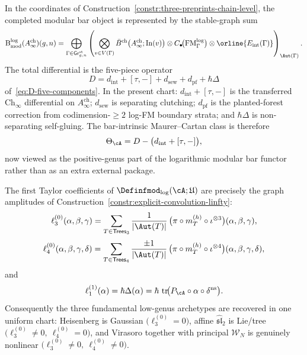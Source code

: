 \begin{construction}
\label{constr:log-modular-bar-functor}
In the coordinates of Construction~\ref{constr:three-preprints-chain-level},
the completed modular bar object is represented by the stable-graph sum
\begin{equation}
\label{eq:log-modular-bar-functor}
\mathrm{B}^{\log}_{\mathrm{mod}}(A^{\mathrm{ch}}_\infty)(g,n)
=
\bigoplus_{\Gamma\in \mathsf{Gr}^{\mathrm{st}}_{g,n}}
\left(
\bigotimes_{v\in V(\Gamma)}
\bar B^{\mathrm{ch}}\bigl(A^{\mathrm{ch}}_\infty;\mathrm{In}(v)\bigr)
\otimes
C_\bullet\!\bigl(\operatorname{FM}^{\log}_{\Gamma}\bigr)
\otimes
\orline{E_{\mathrm{int}}(\Gamma)}
\right)_{\Aut(\Gamma)}.
\end{equation}
The total differential is the five-piece operator
\[
D
=
d_{\mathrm{int}}+[\tau,-]+d_{\mathrm{sew}}+d_{\mathrm{pf}}+\hbar\Delta
\]
of~\eqref{eq:D-five-components}.  In the present chart:
$d_{\mathrm{int}}+[\tau,-]$ is the transferred
$\mathrm{Ch}_\infty$ differential on $A^{\mathrm{ch}}_\infty$;
$d_{\mathrm{sew}}$ is separating clutching;
$d_{\mathrm{pf}}$ is the planted-forest correction from codimension-$\geq2$
log-FM boundary strata; and $\hbar\Delta$ is non-separating self-gluing.
The bar-intrinsic Maurer--Cartan class is therefore
\[
\Theta_\cA
=
D-\bigl(d_{\mathrm{int}}+[\tau,-]\bigr),
\]
now viewed as the positive-genus part of the logarithmic modular bar
functor rather than as an extra external package.
\end{construction}

\begin{computation}
\label{comp:low-genus-log-fm-chart}
The first Taylor coefficients of
$\Definfmod_{\log}(\cA;\mathfrak U)$ are precisely the graph amplitudes of
Construction~\ref{constr:explicit-convolution-linfty}:
\[
\ell_3^{(0)}(\alpha,\beta,\gamma)
=
\sum_{T\in\mathsf{Trees}_3}
\frac{1}{|\Aut(T)|}\,
\bigl(\pi\circ m_T^{(h)}\circ \iota^{\otimes 3}\bigr)
(\alpha,\beta,\gamma),
\]
\[
\ell_4^{(0)}(\alpha,\beta,\gamma,\delta)
=
\sum_{T\in\mathsf{Trees}_4}
\frac{\pm1}{|\Aut(T)|}\,
\bigl(\pi\circ m_T^{(h)}\circ \iota^{\otimes 4}\bigr)
(\alpha,\beta,\gamma,\delta),
\]
and
\[
\ell_1^{(1)}(\alpha)
=
\hbar\Delta(\alpha)
=
\hbar\,\operatorname{tr}\!\bigl(
P_\cA\circ \alpha\circ \delta^{\mathrm{ns}}
\bigr).
\]
Consequently the three fundamental low-genus archetypes are recovered in one
uniform chart: Heisenberg is Gaussian
$\bigl(\ell_3^{(0)}=0\bigr)$, affine
$\widehat{\mathfrak{sl}}_2$ is Lie/tree
$\bigl(\ell_3^{(0)}\neq0,\ \ell_4^{(0)}=0\bigr)$, and Virasoro together
with principal $\mathcal W_N$ is genuinely nonlinear
$\bigl(\ell_3^{(0)}\neq0,\ \ell_4^{(0)}\neq0\bigr)$.
\end{computation}


